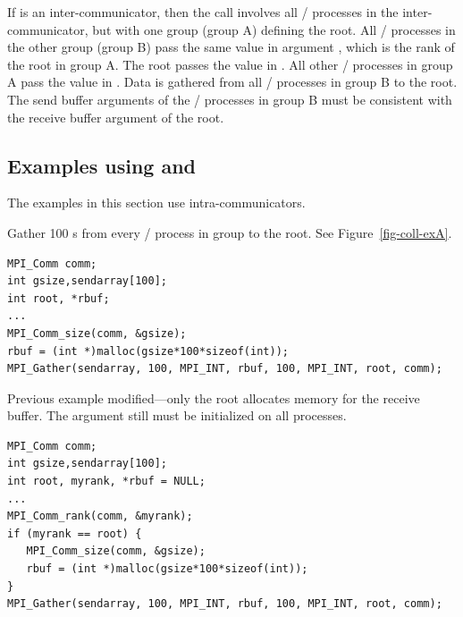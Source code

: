 If  is an inter-communicator, then the call involves all
\MPI/ processes in the inter-communicator, but with one group (group A) defining the
root.  All \MPI/ processes in the other group (group B) pass the same value
in argument
, which is the rank of the root in group A.  The root
passes the value  in .
All other \MPI/ processes in group A pass the value  in
.
Data is gathered from all \MPI/ processes in group B to the root.
The send
buffer arguments of the \MPI/ processes in group B must be consistent with
the receive buffer argument of the root.

\subsection{Examples using \texorpdfstring{}{MPI\_GATHER} and \texorpdfstring{}{MPI\_GATHERV}}

The examples in this section use intra-communicators.

\begin{example}
\label{coll-exA}
%
Gather 100 s from every \MPI/ process in group to the root. See
Figure~\ref{fig-coll-exA}.

\begin{lstlisting}[language={[MPI]C}]
MPI_Comm comm;
int gsize,sendarray[100];
int root, *rbuf;
...
MPI_Comm_size(comm, &gsize);
rbuf = (int *)malloc(gsize*100*sizeof(int));
MPI_Gather(sendarray, 100, MPI_INT, rbuf, 100, MPI_INT, root, comm);
\end{lstlisting}
\end{example}



\begin{example}
\label{coll-exAa}
%
Previous example modified---only the root allocates memory for the
receive buffer. The argument  still must be initialized on all processes.


\begin{lstlisting}[language={[MPI]C}]
MPI_Comm comm;
int gsize,sendarray[100];
int root, myrank, *rbuf = NULL;
...
MPI_Comm_rank(comm, &myrank);
if (myrank == root) {
   MPI_Comm_size(comm, &gsize);
   rbuf = (int *)malloc(gsize*100*sizeof(int));
}
MPI_Gather(sendarray, 100, MPI_INT, rbuf, 100, MPI_INT, root, comm);
\end{lstlisting}
\end{example}


